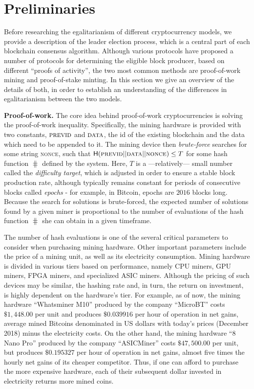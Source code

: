 \section{Preliminaries}\label{sec:preliminaries}

Before researching the egalitarianism of different cryptocurrency models, we
provide a description of the leader election process, which is a central part
of each blockchain consensus algorithm. Although various protocols have
proposed a number of protocols for determining the eligible block producer,
based on different ``proofs of activity'', the two most common methods are
proof-of-work mining and proof-of-stake minting. In this section we give an
overview of the details of both, in order to establish an understanding of the
differences in egalitarianism between the two models.

\noindent\textbf{Proof-of-work.}
The core idea behind proof-of-work cryptocurrencies is solving the
proof-of-work inequality.  Specifically, the mining hardware is provided with
two constants, $\textsc{previd}$ and $\textsc{data}$, \ie the id of the
existing blockchain and the data which need to be appended to it.  The mining
device then \emph{brute-force} searches for some string \textsc{nonce}, such
that $\mathsf{H}(\textsc{previd} || \textsc{data} || \textsc{nonce}) \leq T$ for
some hash function $\hash$ defined by the system. Here, $T$ is a
---relatively--- small number called the \emph{difficulty target}, which is
adjusted in order to ensure a stable block production rate, although typically
remains constant for periods of consecutive blocks called \emph{epochs} - for
example, in Bitcoin, epochs are $2016$ blocks long. Because the search for
solutions is brute-forced, the expected number of solutions found by a given
miner is proportional to the number of evaluations of the
hash function $\hash$ she can obtain in a given timeframe.


The number of hash evaluations is one of the several critical parameters to
consider when purchasing mining hardware. Other important parameters include
the price of a mining unit, as well as its electricity consumption.  Mining
hardware is divided in various tiers based on performance, namely CPU miners,
GPU miners, FPGA miners, and specialized ASIC miners.  Although the pricing of
such devices may be similar, the hashing rate and, in turn, the return on
investment, is highly dependent on the hardware's tier.  For example, as of
now, the mining hardware ``Whatsminer M10'' produced by the company ``MicroBT''
costs $\$1,448.00$ per unit and produces $\$0.039916$ per hour of operation in
net gains, \ie average mined Bitcoins denominated in US dollars with today's
prices (December 2018) minus the electricity costs. On the other hand, the
mining hardware ``8 Nano Pro'' produced by the company ``ASICMiner'' costs
$\$47,500.00$ per unit, but produces $\$0.195327$ per hour of operation in net
gains, \ie almost five times the hourly net gains of its cheaper competitor.
Thus, if one can afford to purchase the more expensive hardware, each of their
subsequent dollar invested in electricity returns more mined coins.

